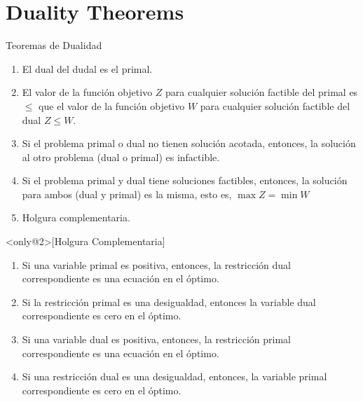 
\section{Duality Theorems}
\label{sec:duality-theorems}

\begin{frame}{Teoremas de Dualidad}
  \begin{enumerate} \justifying \parskip4mm
\item<only@1> El dual del dudal es el primal.
\item<only@1> El valor de la función objetivo $Z$ para cualquier solución factible del primal es $\leq$ que el valor de la función objetivo $W$ para cualquier solución factible del dual $Z \leq W$.
\item<only@1> Si el problema primal o dual no tienen solución acotada, entonces, la solución al otro problema (dual o primal) es infactible.
\item<only@1> Si el problema primal y dual tiene soluciones factibles, entonces, la solución para ambos (dual y primal) es la misma, esto es, $\max Z = \min W$
\item<only@1> Holgura complementaria.
\end{enumerate}

\begin{theorem}<only@2>[Holgura Complementaria]
  \begin{enumerate} \justifying \parskip2mm
  \item Si una variable primal es positiva, entonces, la restricción dual correspondiente es una ecuación en el óptimo.
  \item Si la restricción primal es una desigualdad, entonces la variable dual correspondiente es cero en el óptimo.
  \item Si una variable dual es positiva, entonces, la restricción primal correspondiente es una ecuación en el óptimo.
  \item Si una restricción dual es una desigualdad, entonces, la variable primal correspondiente es cero en el óptimo.
  \end{enumerate}
\end{theorem}
\end{frame}

